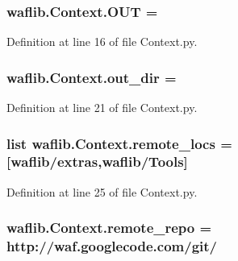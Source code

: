 \subsubsection[{\texorpdfstring{O\+UT}{OUT}}]{ waflib.\+Context.\+O\+UT = \textquotesingle{}}\hypertarget{namespacewaflib_1_1_context_aad61d0808cafcbde47b419c710605574}{}\label{namespacewaflib_1_1_context_aad61d0808cafcbde47b419c710605574}


Definition at line 16 of file Context.\+py.

\subsubsection[{\texorpdfstring{out\+\_\+dir}{out_dir}}]{ waflib.\+Context.\+out\+\_\+dir = \textquotesingle{}\textquotesingle{}}\hypertarget{namespacewaflib_1_1_context_a72b92243377c1a48e548ddb3c388f4d5}{}\label{namespacewaflib_1_1_context_a72b92243377c1a48e548ddb3c388f4d5}


Definition at line 21 of file Context.\+py.

\subsubsection[{\texorpdfstring{remote\+\_\+locs}{remote_locs}}]{\setlength{\rightskip}{0pt plus 5cm}list waflib.\+Context.\+remote\+\_\+locs = \mbox{[}\textquotesingle{}waflib/extras\textquotesingle{},\textquotesingle{}waflib/Tools\textquotesingle{}\mbox{]}}\hypertarget{namespacewaflib_1_1_context_a008d2c01e7118c0aa0e34814022da195}{}\label{namespacewaflib_1_1_context_a008d2c01e7118c0aa0e34814022da195}


Definition at line 25 of file Context.\+py.

\subsubsection[{\texorpdfstring{remote\+\_\+repo}{remote_repo}}]{ waflib.\+Context.\+remote\+\_\+repo = \textquotesingle{}http\+://waf.\+googlecode.\+com/git/\textquotesingle{}}\hypertarget{namespacewaflib_1_1_context_a24399655c41f1c6ccf9a50c5cb6c5222}{}\label{namespacewaflib_1_1_context_a24399655c41f1c6ccf9a50c5cb6c5222}


